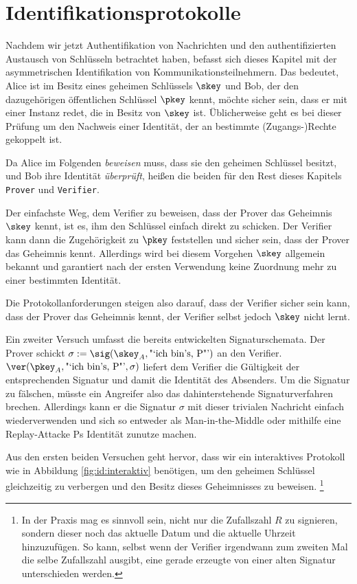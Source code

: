 \chapter{Identifikationsprotokolle}
Nachdem wir jetzt Authentifikation von Nachrichten und den authentifizierten Austausch von Schlüsseln betrachtet haben, befasst sich dieses Kapitel mit der
asymmetrischen Identifikation von Kommunikationsteilnehmern. Das bedeutet, Alice ist im Besitz eines geheimen Schlüssels $\skey$ und Bob, der den dazugehörigen
öffentlichen Schlüssel $\pkey$ kennt, möchte sicher sein, dass er mit einer Instanz redet, die in Besitz von $\skey$ ist. Üblicherweise geht es bei dieser
Prüfung um den Nachweis einer Identität, der an bestimmte (Zugangs-)Rechte gekoppelt ist.

Da Alice im Folgenden \emph{beweisen} muss, dass sie den geheimen Schlüssel besitzt, und Bob ihre Identität \emph{überprüft}, heißen die beiden für den Rest
dieses Kapitels \texttt{Prover} und \texttt{Verifier}.

Der einfachste Weg, dem Verifier zu beweisen, dass der Prover das Geheimnis $\skey$ kennt, ist es, ihm den Schlüssel einfach direkt zu schicken. Der Verifier
kann dann die Zugehörigkeit zu $\pkey$ feststellen und sicher sein, dass der Prover das Geheimnis kennt. Allerdings wird bei diesem Vorgehen $\skey$ allgemein
bekannt und garantiert nach der ersten Verwendung keine Zuordnung mehr zu einer bestimmten Identität.

Die Protokollanforderungen steigen also darauf, dass der Verifier sicher sein kann, dass der Prover das Geheimnis kennt, der Verifier selbst jedoch $\skey$
nicht lernt.

Ein zweiter Versuch umfasst die bereits entwickelten Signaturschemata. Der Prover schickt $\sigma := \sig(\skey_A, \text{"`ich bin's, P"'})$ an den Verifier.
$\ver(\pkey_A,\text{"`ich bin's, P"'}, \sigma)$ liefert dem Verifier die Gültigkeit der entsprechenden Signatur und damit die Identität des Absenders. Um die
Signatur zu fälschen, müsste ein Angreifer also das dahinterstehende Signaturverfahren brechen. Allerdings kann er die Signatur $\sigma$ mit dieser trivialen
Nachricht einfach wiederverwenden und sich so entweder als Man-in-the-Middle oder mithilfe eine Replay-Attacke Ps Identität zunutze machen.

Aus den ersten beiden Versuchen geht hervor, dass wir ein interaktives Protokoll wie in Abbildung \ref{fig:id:interaktiv} benötigen, um den geheimen Schlüssel
gleichzeitig zu verbergen und den Besitz dieses Geheimnisses zu beweisen.%
\footnote{In der Praxis mag es sinnvoll sein, nicht nur die Zufallszahl $R$ zu signieren, sondern dieser noch das aktuelle Datum und die aktuelle Uhrzeit hinzuzufügen. So kann, selbst wenn der Verifier irgendwann zum zweiten Mal die selbe Zufallszahl ausgibt, eine gerade erzeugte von einer alten Signatur unterschieden werden.}


